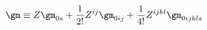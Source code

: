 \begin{equation}
\gm \equiv Z \gm_{0s}+ \frac{1}{2!}Z^{ij}
\gm_{0ij}+\frac{1}{4!}Z^{ijkl}\gm_{0ijkls}
\end{equation}

